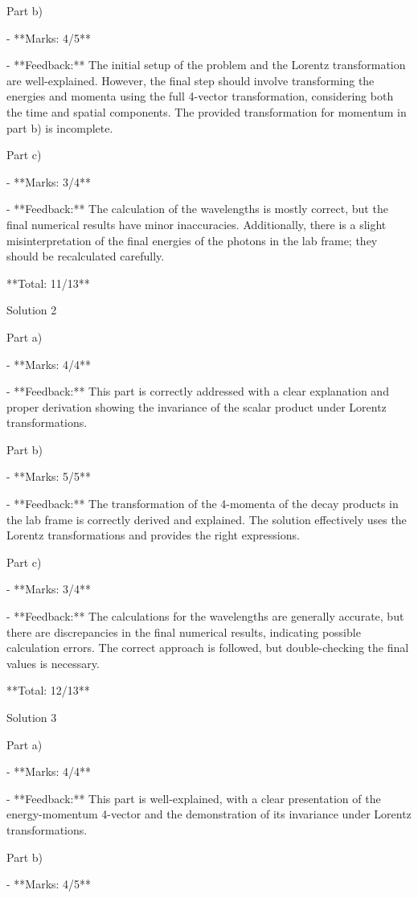 \documentclass[a4paper,11pt]{article}
\begin{document}
Part b)

- **Marks: 4/5**

- **Feedback:** The initial setup of the problem and the Lorentz transformation are well-explained. However, the final step should involve transforming the energies and momenta using the full 4-vector transformation, considering both the time and spatial components. The provided transformation for momentum in part b) is incomplete.

Part c)

- **Marks: 3/4**

- **Feedback:** The calculation of the wavelengths is mostly correct, but the final numerical results have minor inaccuracies. Additionally, there is a slight misinterpretation of the final energies of the photons in the lab frame; they should be recalculated carefully.

**Total: 11/13**

Solution 2

Part a)

- **Marks: 4/4**

- **Feedback:** This part is correctly addressed with a clear explanation and proper derivation showing the invariance of the scalar product under Lorentz transformations.

Part b)

- **Marks: 5/5**

- **Feedback:** The transformation of the 4-momenta of the decay products in the lab frame is correctly derived and explained. The solution effectively uses the Lorentz transformations and provides the right expressions.

Part c)

- **Marks: 3/4**

- **Feedback:** The calculations for the wavelengths are generally accurate, but there are discrepancies in the final numerical results, indicating possible calculation errors. The correct approach is followed, but double-checking the final values is necessary.

**Total: 12/13**

Solution 3

Part a)

- **Marks: 4/4**

- **Feedback:** This part is well-explained, with a clear presentation of the energy-momentum 4-vector and the demonstration of its invariance under Lorentz transformations.

Part b)

- **Marks: 4/5**
\end{document}

